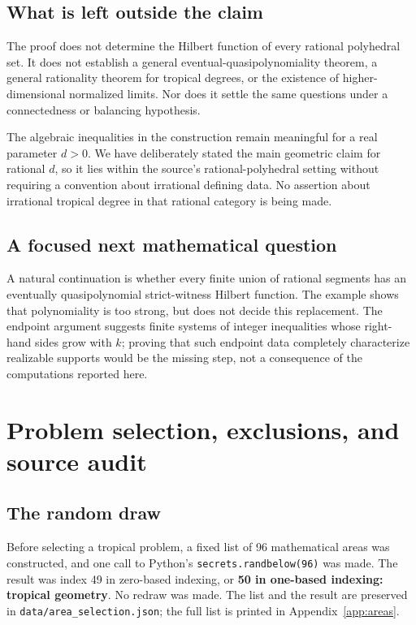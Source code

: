 \documentclass[11pt,a4paper]{article}
\numberwithin{equation}{section}
\theoremstyle{definition}
\theoremstyle{remark}
\begin{document}
\subsection{What is left outside the claim}

The proof does not determine the Hilbert function of every rational
polyhedral set. It does not establish a general eventual-quasipolynomiality
theorem, a general rationality theorem for tropical degrees, or the existence
of higher-dimensional normalized limits. Nor does it settle the same
questions under a connectedness or balancing hypothesis.

The algebraic inequalities in the construction remain meaningful for a real
parameter $d>0$. We have deliberately stated the main geometric claim for
rational $d$, so it lies within the source's rational-polyhedral setting
without requiring a convention about irrational defining data. No assertion
about irrational tropical degree in that rational category is being made.

\subsection{A focused next mathematical question}

A natural continuation is whether every finite union of rational segments
has an eventually quasipolynomial strict-witness Hilbert function. The example
shows that polynomiality is too strong, but does not decide this replacement.
The endpoint argument suggests finite systems of integer inequalities whose
right-hand sides grow with $k$; proving that such endpoint data completely
characterize realizable supports would be the missing step, not a consequence
of the computations reported here.

\appendix
\section{Problem selection, exclusions, and source audit}
\label{app:audit}

\subsection{The random draw}

Before selecting a tropical problem, a fixed list of 96 mathematical areas
was constructed, and one call to Python's \texttt{secrets.randbelow(96)} was
made. The result was index 49 in zero-based indexing, or \textbf{50 in
one-based indexing: tropical geometry}. No redraw was made. The list and
the result are preserved in \texttt{data/area\_selection.json}; the full list
is printed in Appendix~\ref{app:areas}.
\end{document}
